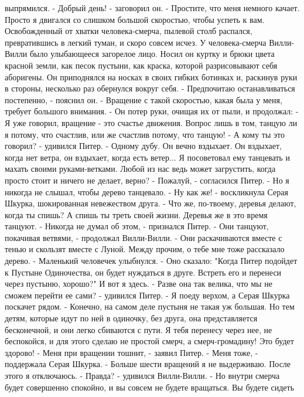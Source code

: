 выпрямился.
    - Добрый день! - заговорил он. - Простите, что меня немного 
качает. Просто я двигался со слишком большой скоростью, чтобы успеть к 
вам.
    Освобожденный от хватки человека-смерча, пылевой столб распался, 
превратившись в легкий туман, и скоро совсем исчез.
    У человека-смерча Вилли-Вилли было улыбающееся загорелое лицо. 
Носил он куртку и брюки цвета красной земли, как песок пустыни, как 
краска, которой разрисовывают себя аборигены. Он приподнялся на носках 
в своих гибких ботинках и, раскинув руки в стороны, несколько раз 
обернулся вокруг себя.
    - Предпочитаю останавливаться постепенно, - пояснил он. - Вращение 
с такой скоростью, какая была у меня, требует большого внимания. - Он 
потер руки, очищая их от пыли, и продолжал: - Я уже говорил, вращение 
- это счастье движения. Вопрос лишь в том, танцую ли я потому, что 
счастлив, или же счастлив потому, что танцую!
    - А кому ты это говорил? - удивился Питер.
    - Одному дубу. Он вечно вздыхает. Он вздыхает, когда нет ветра, он 
вздыхает, когда есть ветер... Я посоветовал ему танцевать и махать 
своими руками-ветками. Любой из нас ведь может загрустить, когда 
просто стоит и ничего не делает, верно?
    - Пожалуй, - согласился Питер. - Но я никогда не слышал, чтобы 
дерево танцевало.
    - Ну как же! - воскликнула Серая Шкурка, шокированная невежеством 
друга. - Что же, по-твоему, деревья делают, когда ты спишь? А спишь ты 
треть своей жизни. Деревья же в это время танцуют.
    - Никогда не думал об этом, - признался Питер.
    - Они танцуют, покачивая ветвями, - продолжал Вилли-Вилли. - Они 
раскачиваются вместе с тенью и скользят вместе с Луной. Между прочим, 
о тебе мне тоже рассказало дерево. - Маленький человечек улыбнулся. - 
Оно сказало: "Когда Питер подойдет к Пустыне Одиночества, он будет 
нуждаться в друге. Встреть его и перенеси через пустыню, хорошо?" И 
вот я здесь.
    - Разве она так велика, что мы не сможем перейти ее сами? - 
удивился Питер. - Я поеду верхом, а Серая Шкурка поскачет рядом.
    - Конечно, на самом деле пустыня не такая уж большая. Но тем 
детям, которые идут по ней в одиночку, без друга, она представляется 
бесконечной, и они легко сбиваются с пути. Я тебя перенесу через нее, 
не беспокойся, и для этого сделаю не простой смерч, а смерч-громадину! 
Это будет здорово!
    - Меня при вращении тошнит, - заявил Питер.
    - Меня тоже, - поддержала Серая Шкурка. - Больше шести вращений я 
не выдерживаю. После этого я отключаюсь.
    - Правда? - удивился Вилли-Вилли. - Но внутри смерча будет 
совершенно спокойно, и вы совсем не будете вращаться. Вы будете сидеть 

